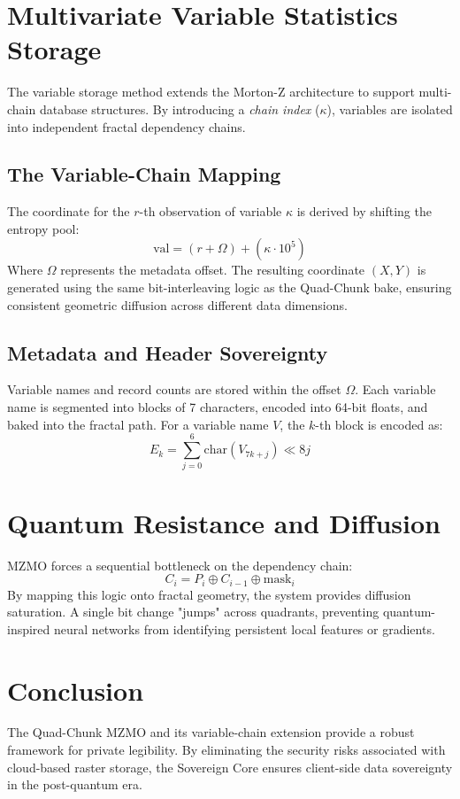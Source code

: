 \documentclass[10pt,twocolumn]{article}
\begin{document}
\section{Multivariate Variable Statistics Storage}
The variable storage method extends the Morton-Z architecture to support multi-chain database structures. By introducing a \textit{chain index} ($\kappa$), variables are isolated into independent fractal dependency chains.

\subsection{The Variable-Chain Mapping}
The coordinate for the $r$-th observation of variable $\kappa$ is derived by shifting the entropy pool:
\begin{equation}
    \text{val} = (r + \Omega) + (\kappa \cdot 10^5)
\end{equation}
Where $\Omega$ represents the metadata offset. The resulting coordinate $(X, Y)$ is generated using the same bit-interleaving logic as the Quad-Chunk bake, ensuring consistent geometric diffusion across different data dimensions.

\subsection{Metadata and Header Sovereignty}
Variable names and record counts are stored within the offset $\Omega$. Each variable name is segmented into blocks of 7 characters, encoded into 64-bit floats, and baked into the fractal path. For a variable name $V$, the $k$-th block is encoded as:
\begin{equation}
    E_k = \sum_{j=0}^{6} \text{char}(V_{7k+j}) \ll 8j
\end{equation}

\section{Quantum Resistance and Diffusion}
MZMO forces a sequential bottleneck on the dependency chain:
\begin{equation}
C_i = P_i \oplus C_{i-1} \oplus \text{mask}_i
\end{equation}
By mapping this logic onto fractal geometry, the system provides diffusion saturation. A single bit change "jumps" across quadrants, preventing quantum-inspired neural networks from identifying persistent local features or gradients.

\section{Conclusion}
The Quad-Chunk MZMO and its variable-chain extension provide a robust framework for private legibility. By eliminating the security risks associated with cloud-based raster storage, the Sovereign Core ensures client-side data sovereignty in the post-quantum era.
\end{document}
